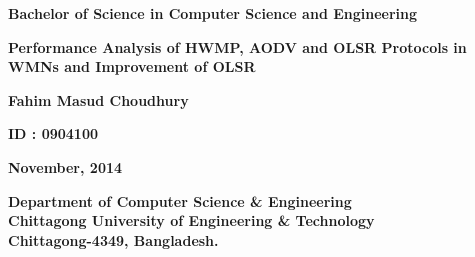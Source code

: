 \begin{center}
\textbf{{\large Bachelor of Science in Computer Science and Engineering}}
\end{center}

\vspace{75mm}

\begin{center}
\textbf{{\large Performance Analysis of HWMP, AODV and OLSR Protocols in WMNs and Improvement of OLSR} }
\end{center}

\vspace{25mm}
\begin{center}
\textbf{Fahim Masud Choudhury}
\

\textbf{ID : 0904100}
\end{center}

\vspace{50mm}
\begin{center}
\textbf{November, 2014}
\end{center}

\vfill

\begin{center}
\textbf{{\large Department of Computer Science \& Engineering} \\
{\normalsize Chittagong University of Engineering \& Technology} \\
{\small Chittagong-4349, Bangladesh.}}
\end{center}
